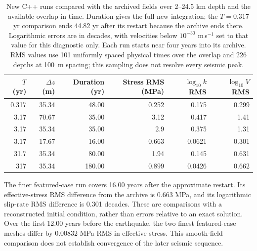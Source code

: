 \begin{table}[h]
\centering\small
\begin{tabular}{rrrrrr}\toprule
$T$ (yr) & $\Delta z$ (m) & Duration (yr) & Stress RMS (MPa) & $\log_{10}k$ RMS & $\log_{10}V$ RMS\\\midrule
0.317 & 35.34 & 48.00 & 0.252 & 0.175 & 0.299 \\
3.17 & 70.67 & 35.00 & 3.12 & 0.417 & 1.41 \\
3.17 & 35.34 & 35.00 & 2.9 & 0.375 & 1.31 \\
3.17 & 17.67 & 16.00 & 0.663 & 0.0621 & 0.301 \\
31.7 & 35.34 & 80.00 & 1.94 & 0.145 & 0.631 \\
317 & 35.34 & 180.00 & 0.899 & 0.0426 & 0.662 \\
\bottomrule\end{tabular}
\caption{New C++ runs compared with the archived fields over 2--24.5 km depth and the available overlap in time. Duration gives the full new integration; the $T=0.317$ yr comparison ends 44.82 yr after its restart because the archive ends there. Logarithmic errors are in decades, with velocities below $10^{-30}$ m\,s$^{-1}$ set to that value for this diagnostic only. Each run starts near four years into its archive. RMS values use 101 uniformly spaced physical times over the overlap and 226 depths at 100~m spacing; this sampling does not resolve every seismic peak.}
\end{table}
The finer featured-case run covers 16.00 years after the approximate restart. Its effective-stress RMS difference from the archive is 0.663 MPa, and its logarithmic slip-rate RMS difference is 0.301 decades. These are comparisons with a reconstructed initial condition, rather than errors relative to an exact solution. Over the first 12.00 years before the earthquake, the two finest featured-case meshes differ by 0.00832 MPa RMS in effective stress. This smooth-field comparison does not establish convergence of the later seismic sequence.

